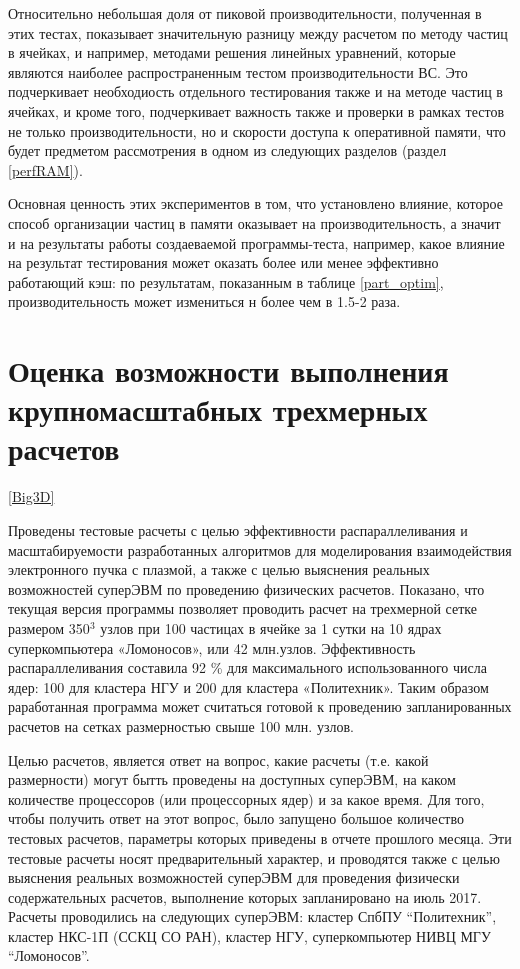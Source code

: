 Относительно небольшая доля от пиковой производительности, полученная в этих тестах, показывает значительную разницу между расчетом по методу частиц в ячейках, и например, методами решения линейных уравнений, которые являются наиболее распространенным тестом производительности ВС. Это подчеркивает необходиость отдельного тестирования также и на методе частиц в ячейках, и кроме того, подчеркивает важность также и проверки в рамках тестов не только производительности, но и скорости доступа к оперативной памяти, что будет предметом рассмотрения в одном из следующих разделов (раздел \ref{perfRAM}). 

Основная ценность этих экспериментов в том, что установлено влияние, которое способ организации частиц в памяти оказывает на производительность, а значит и на результаты работы создаеваемой программы-теста, например, какое влияние на результат тестирования может оказать более или менее эффективно работающий кэш: по результатам, показанным в таблице \ref{part_optim}, производительность может измениться н более чем в 1.5-2 раза.

\section{Оценка возможности выполнения крупномасштабных трехмерных расчетов}
\ref{Big3D}

Проведены тестовые расчеты с целью эффективности распараллеливания и масштабируемости разработанных алгоритмов для моделирования взаимодействия электронного пучка с плазмой, а также с целью выяснения реальных возможностей суперЭВМ по проведению физических расчетов. Показано, что текущая версия программы позволяет проводить расчет на трехмерной сетке размером 350$^3$ узлов при 100 частицах в ячейке за 1 сутки на 10 ядрах суперкомпьютера «Ломоносов», или 42 млн.узлов. Эффективность распараллеливания составила 92 \% для максимального использованного числа ядер: 100 для кластера НГУ и 200 для кластера «Политехник».  Таким образом раработанная программа может считаться готовой к проведению запланированных расчетов на сетках размерностью свыше 100 млн. узлов.















Целью расчетов,  является ответ на вопрос, какие расчеты (т.е. какой размерности) могут бытть проведены на доступных суперЭВМ, на каком количестве процессоров (или процессорных ядер) и за какое время. 
Для того, чтобы получить ответ на этот вопрос, было запущено большое количество тестовых расчетов, параметры которых приведены в отчете прошлого месяца. Эти тестовые расчеты носят предварительный характер, и проводятся также с целью выяснения реальных возможностей суперЭВМ для проведения физически содержательных расчетов, выполнение которых запланировано   на июль 2017. 	Расчеты проводились на следующих суперЭВМ: кластер СпбПУ “Политехник”, кластер НКС-1П (ССКЦ СО РАН), кластер НГУ,  суперкомпьютер НИВЦ МГУ “Ломоносов”. 

